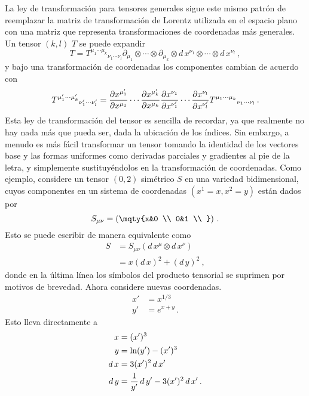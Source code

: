 \documentclass[11pt,b5paper,openany,twoside]{book}
\newcommand{\mn}{{\mu\nu}}
\newcommand{\p}[1]{{\partial_{#1}}}
\begin{document}
La ley de transformación para tensores generales sigue este mismo patrón de reemplazar la matriz de transformación de Lorentz utilizada en el espacio plano con una matriz que representa transformaciones de coordenadas más generales.
Un tensor $(k,l)$ $T$ se puede expandir
\begin{equation}
T = T^{\mu_1 \cdots \mu_k}{}_{\nu_1\cdots\nu_l}
\p{\mu_1}\otimes\cdots\otimes\p{\mu_k}\otimes
 d\,x^{\nu_1}\otimes\cdots\otimes d\,x^{\nu_l}\ ,\label{2.18}
\end{equation}
y bajo una transformación de coordenadas los componentes cambian de acuerdo con
\begin{equation}
T^{\mu_1' \cdots \mu_k'}{}_{\nu_1'\cdots\nu_l'} =
{{\partial x^{\mu_1'}}\over{\partial x^{\mu_1}}}\cdots
{{\partial x^{\mu_k'}}\over{\partial x^{\mu_k}}}
{{\partial x^{\nu_1}}\over{\partial x^{\nu_1'}}}\cdots
{{\partial x^{\nu_l}}\over{\partial x^{\nu_l'}}}
T^{\mu_1 \cdots \mu_k}{}_{\nu_1\cdots\nu_l} \,.\label{2.19}
\end{equation}
Esta ley de transformación del tensor es sencilla de recordar, ya que realmente no hay nada más que pueda ser, dada la ubicación de los índices.
Sin embargo, a menudo es más fácil transformar un tensor tomando la identidad de los vectores base y las formas uniformes como derivadas parciales y gradientes al pie de la letra, y simplemente sustituyéndolos en la transformación de coordenadas.
Como ejemplo, considere un tensor $(0, 2)$ simétrico $S$ en una variedad bidimensional, cuyos componentes en un sistema de coordenadas $(x^1=x, x^2=y)$ están dados por
\begin{equation}
S_\mn = \left(\mqty{x&0 \\  0&1 \\ }\right)\,.\label{2.20}
\end{equation}
Esto se puede escribir de manera equivalente como
\begin{align}
S &=  S_\mn ( d\,x^\mu \otimes  d\,x^\nu)\nonumber \\
&=  x( d\,x)^2 + ( d\,y)^2\ , \label{2.21}
\end{align}
donde en la última línea los símbolos del producto tensorial se suprimen por motivos de brevedad.
Ahora considere nuevas coordenadas.
\begin{align}
x' &=  x^{1/3}\nonumber \\ y' &=  e^{x+y}\,. \label{2.22}
\end{align}
Esto lleva directamente a
\begin{align}
x &=  (x')^3\nonumber \\ y &=  \ln(y') - (x')^3\nonumber \\
 d\,x &=  3(x')^2 \, d\,x'\nonumber \\  d\,y &=  {1\over{y'}}\, d\,y'
- 3(x')^2\, d\,x'\,.
\label{2.23}
\end{align}
\end{document}
